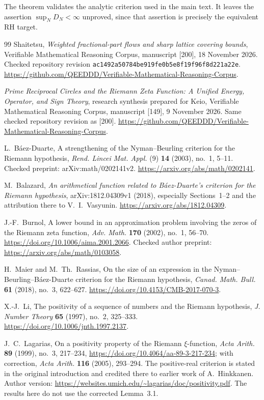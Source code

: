 \documentclass[11pt,a4paper]{article}
\theoremstyle{definition}\newtheorem{definition}[theorem]{Definition}
\theoremstyle{remark}\newtheorem{remark}[theorem]{Remark}
\numberwithin{equation}{section}
\begin{document}
The theorem validates the analytic criterion used in the main text.
It leaves the assertion $\sup_ND_N<\infty$ unproved, since that
assertion is precisely the equivalent RH target.

\begin{thebibliography}{99}
Shaitetsu,
\emph{Weighted fractional-part flows and sharp lattice covering bounds},
Verifiable Mathematical Reasoning Corpus, manuscript [200],
18 November 2026. Checked repository revision
\texttt{ac1492a50784be919fe0b5e8f19f96f8d221a22e}.
\url{https://github.com/QEEDDD/Verifiable-Mathematical-Reasoning-Corpus}.

\emph{Prime Reciprocal Circles and the Riemann Zeta Function:
A Unified Energy, Operator, and Sign Theory},
research synthesis prepared for Keio,
Verifiable Mathematical Reasoning Corpus, manuscript [149],
9 November 2026. Same checked repository revision as [200].
\url{https://github.com/QEEDDD/Verifiable-Mathematical-Reasoning-Corpus}.

L.~B\'aez-Duarte,
A strengthening of the Nyman--Beurling criterion for the Riemann hypothesis,
\emph{Rend. Lincei Mat. Appl.} (9) \textbf{14} (2003), no.~1, 5--11.
Checked preprint: arXiv:math/0202141v2.
\url{https://arxiv.org/abs/math/0202141}.

M.~Balazard,
\emph{An arithmetical function related to B\'aez-Duarte's criterion
for the Riemann hypothesis}, arXiv:1812.04309v1 (2018),
especially Sections~1--2 and the attribution there to V.~I.~Vasyunin.
\url{https://arxiv.org/abs/1812.04309}.

J.-F.~Burnol,
A lower bound in an approximation problem involving the zeros of the
Riemann zeta function,
\emph{Adv. Math.} \textbf{170} (2002), no.~1, 56--70.
\url{https://doi.org/10.1006/aima.2001.2066}.
Checked author preprint: \url{https://arxiv.org/abs/math/0103058}.

H.~Maier and M.~Th.~Rassias,
On the size of an expression in the Nyman--Beurling--B\'aez-Duarte
criterion for the Riemann hypothesis,
\emph{Canad. Math. Bull.} \textbf{61} (2018), no.~3, 622--627.
\url{https://doi.org/10.4153/CMB-2017-070-3}.

X.-J.~Li,
The positivity of a sequence of numbers and the Riemann hypothesis,
\emph{J. Number Theory} \textbf{65} (1997), no.~2, 325--333.
\url{https://doi.org/10.1006/jnth.1997.2137}.

J.~C.~Lagarias,
On a positivity property of the Riemann $\xi$-function,
\emph{Acta Arith.} \textbf{89} (1999), no.~3, 217--234,
\url{https://doi.org/10.4064/aa-89-3-217-234};
with correction, \emph{Acta Arith.} \textbf{116} (2005), 293--294.
The positive-real criterion is stated in the original introduction
and credited there to earlier work of A.~Hinkkanen.
Author version:
\url{https://websites.umich.edu/~lagarias/doc/positivity.pdf}.
The results here do not use the corrected Lemma~3.1.


\end{thebibliography}
\end{document}
